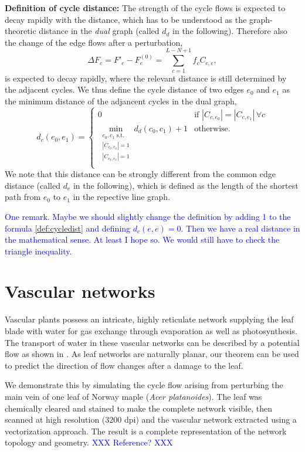 \documentclass[10pt,aps,pra,twocolumn,superscriptaddress]{revtex4-1}
\newcommand{\dirk}[1]{\textcolor{blue}{#1}}
\newcommand{\be}{\begin{equation}}
\newcommand{\ee}{\end{equation}}
\begin{document}
\textbf{Definition of cycle distance:}
The strength of the cycle flows is expected to decay rapidly with the distance, which has to be 
understood as the graph-theoretic distance in the \emph{dual} graph (called $d_d$ in the following).
Therefore also the change of the edge flows after a perturbation,
\be
   \Delta F_e = F'_e  - F_e^{(0)} = \sum_{c=1}^{L-N+1} f_c C_{c,e},
\ee
is expected to decay rapidly, where the relevant distance is still determined by the adjacent 
cycles. We thus define the cycle distance of two edges $e_0$ and $e_1$ as the minimum distance 
of the adjancent cycles in the dual graph, 
\be
  d_c(e_0,e_1) = 
  \begin{cases}
      0 & \text{if } |C_{c,e_0}| = |C_{c,e_1}| \,  \forall c \\
      \min \limits_{\substack{c_0,c_1 \text{ s.t.} \\  |C_{c_0,e_0}| = 1 \\  |C_{c_1,e_1}| = 1}} 
          d_d(c_0,c_1) +1
      & \text{otherwise.} \\
  \end{cases}
  \label{def:cycledist}
\ee
We note that this distance can be strongly different from the common edge distance
(called $d_e$ in the following), which is defined as the length of the shortest path from
$e_0$ to $e_1$ in the repective line graph.

\dirk{One remark. Maybe we should slightly change the definition by adding 1 to the formula
\ref{def:cycledist} and defining $d_c(e,e) = 0$. Then we have a real distance in the mathematical 
sense. At least I hope so. We would still have to check the triangle inequality.}


\section{Vascular networks}


Vascular plants possess an intricate, highly reticulate network 
supplying the leaf blade with water for gas exchange through
evaporation as well as photosynthesis.
The transport of water in these vascular networks can be described by a 
potential flow as shown in \cite{Kati10}.
As leaf networks are naturally planar, our theorem can be 
used to predict the direction of flow changes after a damage to the leaf.

We demonstrate this by simulating the cycle flow arising from perturbing
the main vein of one leaf of Norway maple (\emph{Acer platanoides}).
The leaf was chemically cleared and stained to make the complete network
visible, then scanned at high resolution (3200 dpi) and the vascular
network extracted using a vectorization approach. The result is a
complete representation of the network topology and geometry.
\dirk{XXX Reference? XXX}
\end{document}
